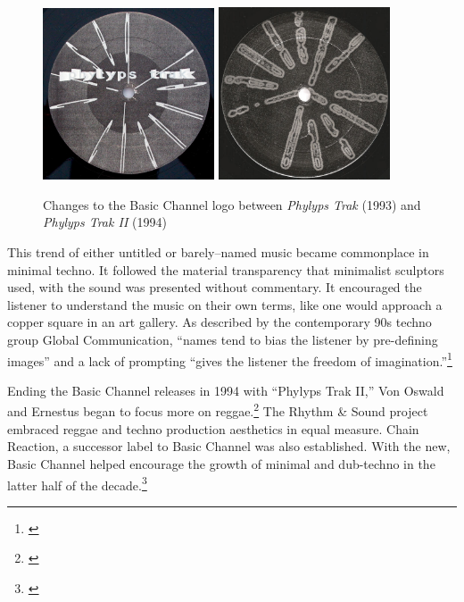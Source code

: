 \documentclass[12pt,twoside]{reedthesis}
\begin{document}
\begin{figure}[htbp]
	\begin{centering}
		\includegraphics[width=2in]{./Images/phylyps_trak}
		\includegraphics[width=2in]{./Images/phylyps_trak_ii}
		\caption{Changes to the Basic Channel logo between \emph{Phylyps Trak} (1993) and \emph{Phylyps Trak II} (1994)}
		\label{fig:bclogo}
	\end{centering}
\end{figure}

This trend of either untitled or barely--named music became commonplace in minimal techno. It followed the material transparency that minimalist sculptors used, with the sound was presented without commentary. It encouraged the listener to understand the music on their own terms, like one would approach a copper square in an art gallery. As described by the contemporary 90s techno group Global Communication, ``names tend to bias the listener by pre-defining images'' and a lack of prompting ``gives the listener the freedom of imagination.''\footnote{\cite{globalcommunication76141994}}

Ending the Basic Channel releases in 1994 with ``Phylyps Trak II,'' Von Oswald and Ernestus began to focus more on reggae.\footnote{\cite{basicchannelPhylypsTrakII1994}} The Rhythm {\&} Sound project embraced reggae and techno production aesthetics in equal measure. Chain Reaction, a successor label to Basic Channel was also established. With the new, Basic Channel helped encourage the growth of minimal and dub-techno in the latter half of the decade.\footnote{\cite{maya-roisinslaterGerhardBehlesRobert2016}}
\end{document}
